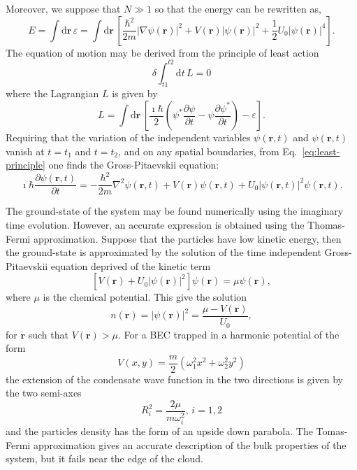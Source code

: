 Moreover, we suppose that $N \gg 1$ so that the energy can be rewritten as,
\begin{equation}
E = \int \mathrm{d} \textbf{r} \, \varepsilon  = \int \mathrm{d} \textbf{r} \, \left[ \frac{\hbar^2}{2m} |\nabla \psi(\textbf{r}) |^2 + V(\textbf{r}) |\psi(\textbf{r})|^2 + \frac{1}{2} U_0 |\psi(\textbf{r})|^4 \right].
\end{equation}
The equation of motion may be derived from the principle of least action 
\begin{equation}
\delta \int_{t1}^{t2} \mathrm{d} t \, L = 0 \label{eq:least-principle}
\end{equation}
where the Lagrangian $L$ is given by
\begin{equation}
L = \int \mathrm{d} \textbf{r} \, \left[ \frac{\imath \hbar}{2} \left( \psi^\ast \frac{\partial \psi}{\partial t} - \psi \frac{\partial \psi^\ast}{\partial t} \right) - \varepsilon \right].
\end{equation}
Requiring that the variation of the independent variables $\psi(\textbf{r},t)$ and $\psi(\textbf{r},t)$ vanish at $t=t_1$ and $t=t_2$, and on any spatial boundaries, from Eq.~\eqref{eq:least-principle} one finds the Gross-Pitaevskii equation:
\begin{equation}
\imath \hbar \frac{\partial \psi(\textbf{r}, t)}{\partial t} = - \frac{\hbar^2}{2m} \nabla^2 \psi(\textbf{r}, t) + V(\textbf{r}) \psi(\textbf{r}, t) + U_0 |\psi(\textbf{r}, t)|^2 \psi(\textbf{r}, t).
\end{equation}

The ground-state of the system may be found numerically using the imaginary time evolution. However, an accurate expression is obtained using the Thomas-Fermi approximation. Suppose that the particles have low kinetic energy, then the ground-state is approximated by the solution of the time independent Gross-Pitaevskii equation deprived of the kinetic term
\begin{equation}
\left[ V(\textbf{r}) + U_0 |\psi(\textbf{r})|^2 \right] \psi(\textbf{r}) = \mu \psi(\textbf{r}),
\end{equation}
where $\mu$ is the chemical potential. This give the solution
\begin{equation}
n(\textbf{r}) = |\psi(\textbf{r})|^2 = \frac{\mu - V(\textbf{r})}{U_0},
\end{equation}
for $\textbf{r}$ such that $V(\textbf{r}) > \mu$. 
For a BEC trapped in a harmonic potential of the form
\begin{equation}
V(x,y) = \frac{m}{2} (\omega_1^2 x^2 + \omega_2^2 y^2)
\end{equation}
the extension of the condensate wave function in the two directions is given by the two semi-axes
\begin{equation}
R_i^2 = \frac{2\mu}{m\omega_i^2}, \, i = 1,2
\end{equation}
and the particles density has the form of an upside down parabola. The Tomas-Fermi approximation gives an accurate description of the bulk properties of the system, but it fails near the edge of the cloud.
